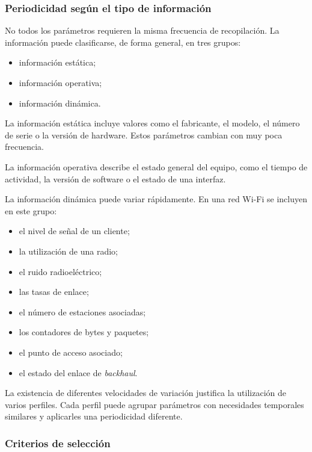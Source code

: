 \subsubsection*{Periodicidad según el tipo de información}

No todos los parámetros requieren la misma frecuencia de recopilación.
La información puede clasificarse, de forma general, en tres grupos:

\begin{itemize}
    \item información estática;
    \item información operativa;
    \item información dinámica.
\end{itemize}

La información estática incluye valores como el fabricante, el modelo, el
número de serie o la versión de hardware. Estos parámetros cambian con muy
poca frecuencia.

La información operativa describe el estado general del equipo, como el
tiempo de actividad, la versión de software o el estado de una interfaz.

La información dinámica puede variar rápidamente. En una red Wi-Fi se
incluyen en este grupo:

\begin{itemize}
    \item el nivel de señal de un cliente;
    \item la utilización de una radio;
    \item el ruido radioeléctrico;
    \item las tasas de enlace;
    \item el número de estaciones asociadas;
    \item los contadores de bytes y paquetes;
    \item el punto de acceso asociado;
    \item el estado del enlace de \textit{backhaul}.
\end{itemize}

La existencia de diferentes velocidades de variación justifica la
utilización de varios perfiles. Cada perfil puede agrupar parámetros con
necesidades temporales similares y aplicarles una periodicidad diferente.


\subsubsection*{Criterios de selección}

